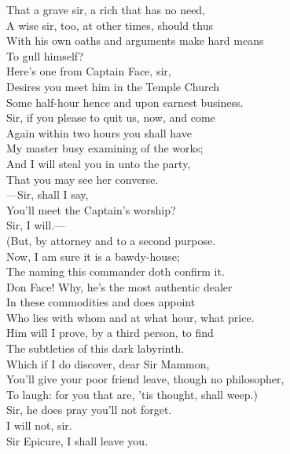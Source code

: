\documentclass[a4paper,oneside,12pt]{memoir}
\begin{document}
\begin{drama*}
That a grave sir, a rich that has no need,\\
A wise sir, too, at other times, should thus\\
With his own oaths and arguments make hard means\\
To gull himself?\\
\facespeaks {}  Here's one from Captain Face, sir,\\
Desires you meet him in the Temple Church\\
Some half-hour hence and upon earnest business.\\
Sir, if you please to quit us, now, and come\\
Again within two hours you shall have\\
My master busy examining of the works;\\
And I will steal you in unto the party,\\
That you may see her converse.\\
 ---Sir, shall I say,\\
You'll meet the Captain's worship?\\
\surlyspeaks {} Sir, I will.---\\
(But, by attorney and to a second purpose.\\
Now, I am sure it is a bawdy-house;\\
The naming this commander doth confirm it.\\
Don Face! Why, he's the most authentic dealer\\
In these commodities and does appoint\\
Who lies with whom and at what hour, what price.\\
Him will I prove, by a third person, to find\\
The subtleties of this dark labyrinth.\\
Which if I do discover, dear Sir Mammon,\\
You'll give your poor friend leave, though no philosopher,\\
To laugh: for you that are, 'tis thought, shall weep.)\\
\facespeaks Sir, he does pray you'll not forget.\\
\surlyspeaks {} I will not, sir.\\
Sir Epicure, I shall leave you.\\

\end{drama*}
\end{document}
